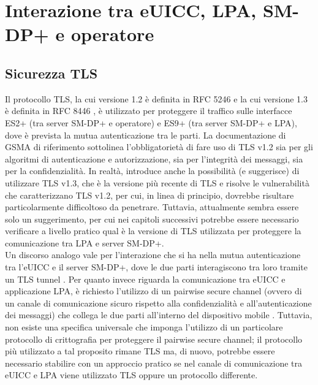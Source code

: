 \documentclass[10pt, oneside]{book}
\begin{document}
\section{Interazione tra eUICC, LPA, SM-DP+ e operatore}
\subsection{Sicurezza TLS}
Il protocollo TLS, la cui versione 1.2 è definita in RFC 5246 \cite{RFC-5246} e la cui versione 1.3 è definita in RFC 8446 \cite{RFC-8446}, è utilizzato per proteggere il traffico sulle interfacce ES2+ (tra server SM-DP+ e operatore) e ES9+ (tra server SM-DP+ e LPA), dove è prevista la mutua autenticazione tra le parti. La documentazione di GSMA di riferimento \cite{GSMA-docs-new} sottolinea l'obbligatorietà di fare uso di TLS v1.2 sia per gli algoritmi di autenticazione e autorizzazione, sia per l'integrità dei messaggi, sia per la confidenzialità. In realtà, introduce anche la possibilità (e suggerisce) di utilizzare TLS v1.3, che è la versione più recente di TLS e risolve le vulnerabilità che caratterizzano TLS v1.2, per cui, in linea di principio, dovrebbe risultare particolarmente difficoltoso da penetrare. Tuttavia, attualmente sembra essere solo un suggerimento, per cui nei capitoli successivi potrebbe essere necessario verificare a livello pratico qual è la versione di TLS utilizzata per proteggere la comunicazione tra LPA e server SM-DP+.\\
Un discorso analogo vale per l'interazione che si ha nella mutua autenticazione tra l'eUICC e il server SM-DP+, dove le due parti interagiscono tra loro tramite un TLS tunnel \cite{Sec-analysis}. Per quanto invece riguarda la comunicazione tra eUICC e applicazione LPA, è richiesto l'utilizzo di un pairwise secure channel (ovvero di un canale di comunicazione sicuro rispetto alla confidenzialità e all'autenticazione dei messaggi) che collega le due parti all'interno del dispositivo mobile \cite{Sec-analysis}. Tuttavia, non esiste una specifica universale che imponga l'utilizzo di un particolare protocollo di crittografia per proteggere il pairwise secure channel; il protocollo più utilizzato a tal proposito rimane TLS ma, di nuovo, potrebbe essere necessario stabilire con un approccio pratico se nel canale di comunicazione tra eUICC e LPA viene utilizzato TLS oppure un protocollo differente.
\end{document}
